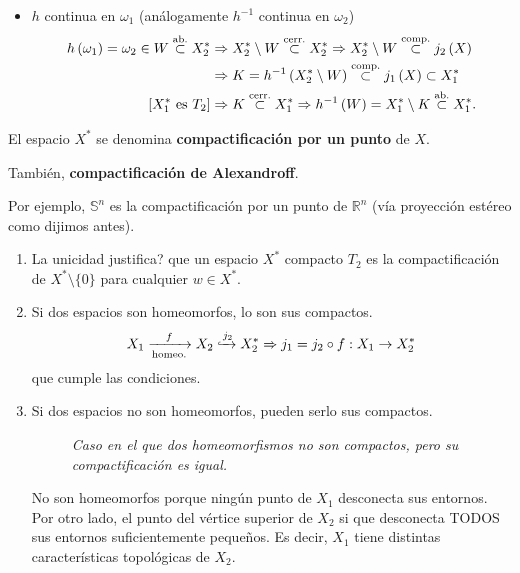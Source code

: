 \begin{demo}
\begin{enumerate}
\begin{itemize}
        \item $h$ continua en $\omega_1$ (análogamente $h^{-1}$ continua en $\omega_2$)
        \begin{align*}
            h\left( \omega_1 \right) = \omega_2 \in W \stackrel{\text{ab.}}{\subset} X_2^* &\Rightarrow X_2^* \setminus W \stackrel{\text{cerr.}}{\subset} X_2^* \Rightarrow X_2^* \setminus W \stackrel{\text{comp.}}{\subset} j_2\left( X \right)\\
            &\Rightarrow K = h^{-1}\left( X_2^* \setminus W \right) \stackrel{\text{comp.}}{\subset} j_1\left( X \right) \subset X_1^*\\
            \left[ X_1^* \text{ es } T_2 \right] &\Rightarrow K \stackrel{\text{cerr.}}{\subset} X_1^* \Rightarrow h^{-1}\left( W \right) = X_1^* \setminus K \stackrel{\text{ab.}}{\subset} X_1^*
        .\end{align*}
    \end{itemize}
\end{enumerate}
\end{demo}

\begin{defi}
El espacio $X^*$ se denomina \textbf{compactificación por un punto} de $X$. 

También, \textbf{compactificación de Alexandroff}.
\end{defi}
Por ejemplo, $\mathbb{S}^n$ es la compactificación por un punto de $\mathbb{R}^n$ (vía proyección estéreo como dijimos antes).

\begin{obs}[¡Importante!]
\begin{enumerate}
    \item La unicidad justifica? que un espacio $X^*$ compacto $T_2$ es la compactificación de $X^* \setminus \{0\}$ para cualquier $w \in X^*$.

    \item Si dos espacios son homeomorfos, lo son sus compactos.
    \[
        X_1 \xrightarrow[\text{homeo.}]{f} X_2 \xhookrightarrow{j_2} X_2^* \Rightarrow j_1 = j_2 \circ f : X_1 \rightarrow X_2^*
    \]
    que cumple las condiciones.

    \item Si dos espacios no son homeomorfos, pueden serlo sus compactos.
    \begin{figure}[H]
        \centering
        \caption{\textit{Caso en el que dos homeomorfismos no son compactos, pero su compactificación es igual.}}
        \label{fig:homeomorfismos-y-compactificación}
    \end{figure}
    No son homeomorfos porque %
    ningún punto de $X_1$ desconecta sus entornos. Por otro lado, el punto del vértice superior de $X_2$ si que desconecta TODOS sus entornos suficientemente pequeños. 
    Es decir, $X_1$ tiene distintas características topológicas de $X_2$.
\end{enumerate} 
\end{obs}

